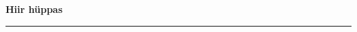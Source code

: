 \documentclass[10pt]{book}
\begin{document}
{
  \samepage
  \raggedbottom
  \raggedright
  \sloppy


  \vspace{0.2in}

  \noindent\begin{minipage}{.1\textwidth}
    \hfill\vspace{0.1in}
  \end{minipage}%
  \noindent\begin{minipage}{.8\textwidth}
    \centering
    \bfseries
    \large Hiir h\"uppas
  \end{minipage}%
  \noindent\begin{minipage}{.1\textwidth}
      \hfill\vspace{0.1in}
  \end{minipage}

  \nopagebreak[4]
  \vspace{0.1in}
  \nopagebreak[4]
  \hrule height 0.05ex
  \nopagebreak[4]
  \vspace{-0.05in}




}
\end{document}
